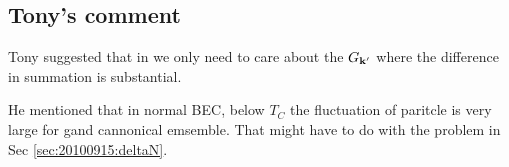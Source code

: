 \subsection{Tony's comment}
Tony suggested that in  we only need to care about the $G_{\mathbf{k}'}$ where the difference in summation is substantial.  

He mentioned that in normal BEC, below $T_{C}$ the fluctuation of paritcle is very large for gand cannonical emsemble.  That might have to do with the problem in Sec \ref{sec:20100915:deltaN}.